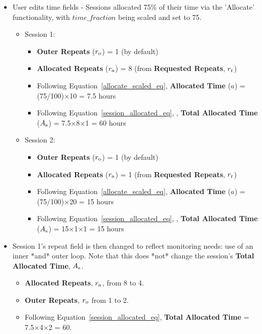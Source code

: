 \documentclass{article}
\begin{document}
\begin{itemize}
\begin{itemize}
    \end{itemize}
\item User edits time fields - Sessions allocated 75\% of their time via the 'Allocate' functionality, with $time\_fraction$ being scaled and set to 75.
    \begin{itemize}
    \item Session 1: 
        \begin{itemize}
        \item {\bf Outer Repeats} ($r_{\rm o}$) = 1 (by default)
        \item {\bf Allocated Repeats} ($r_{\rm a}$) = 8 (from {\bf Requested Repeats}, $r_{\rm r}$)
        \item Following Equation~\ref{allocate_scaled_eq}, {\bf Allocated Time} ($a$) = (75/100)$\times$10 = 7.5 hours
        \item Following Equation~\ref{session_allocated_eq}, , {\bf Total Allocated Time} ($A_{\rm s}$) = 7.5$\times$8$\times$1 = 60 hours
        \end{itemize}
    \item Session 2: 
        \begin{itemize}
        \item {\bf Outer Repeats} ($r_{\rm o}$) = 1 (by default)
        \item {\bf Allocated Repeats} ($r_{\rm a}$) = 1 (from {\bf Requested Repeats}, $r_{\rm r}$)
        \item Following Equation~\ref{allocate_scaled_eq}, {\bf Allocated Time} ($a$) = (75/100)$\times$20 = 15 hours
        \item Following Equation~\ref{session_allocated_eq}, , {\bf Total Allocated Time} ($A_{\rm s}$) = 15$\times$1$\times$1 = 15 hours
         \end{itemize}
     \end{itemize}
\item Session 1's repeat field is then changed to reflect monitoring needs: use of an inner *and* outer loop.  Note that this does *not* change the session's {\bf Total Allocated Time}, $A_{\rm s}$.
    \begin{itemize}
    \item {\bf Allocated Repeats}, $r_{\rm a}$, from 8 to 4.
    \item {\bf Outer Repeats}, $r_{\rm o}$ from 1 to 2.
    \item Following Equation~\ref{session_allocated_eq}, {\bf Total Allocated Time} = 7.5$\times$4$\times$2 = 60.
    \end{itemize}

\end{itemize}
\end{document}
